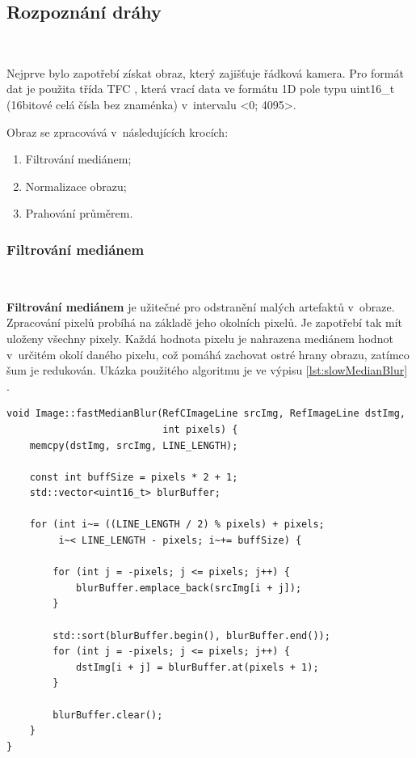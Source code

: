 \subsection{Rozpoznání dráhy}\

Nejprve bylo zapotřebí získat obraz, který zajišťuje řádková kamera. Pro formát dat
je použita třída TFC \cite{draha}, která vrací data ve formátu 1D pole typu 
uint16\_t (16bitové celá čísla bez znaménka) v~intervalu <0; 4095>.

Obraz se zpracovává v~následujících krocích:
\begin{enumerate}
    \item Filtrování mediánem;
    \item Normalizace obrazu;
    \item Prahování průměrem.
\end{enumerate}

\subsubsection*{Filtrování mediánem}\

\textbf{Filtrování mediánem} je užitečné pro odstranění malých artefaktů v~obraze.
Zpracování pixelů probíhá na základě jeho okolních pixelů. Je zapotřebí tak mít
uloženy všechny pixely. Každá hodnota pixelu je nahrazena mediánem hodnot v~určitém
okolí daného pixelu, což pomáhá zachovat ostré hrany obrazu, zatímco šum je
redukován. Ukázka použitého algoritmu je ve výpisu \ref{lst:slowMedianBlur} 
\cite{draha}\cite{robot}.

\begin{lstlisting}[caption = Filtrování mediánem., label = lst:slowMedianBlur]
void Image::fastMedianBlur(RefCImageLine srcImg, RefImageLine dstImg,
                           int pixels) {
    memcpy(dstImg, srcImg, LINE_LENGTH);
   
    const int buffSize = pixels * 2 + 1;
    std::vector<uint16_t> blurBuffer;

    for (int i~= ((LINE_LENGTH / 2) % pixels) + pixels;
         i~< LINE_LENGTH - pixels; i~+= buffSize) {
        
        for (int j = -pixels; j <= pixels; j++) {
            blurBuffer.emplace_back(srcImg[i + j]);
        }
        
        std::sort(blurBuffer.begin(), blurBuffer.end());
        for (int j = -pixels; j <= pixels; j++) {
            dstImg[i + j] = blurBuffer.at(pixels + 1);
        }
        
        blurBuffer.clear();
    }
}
\end{lstlisting}

